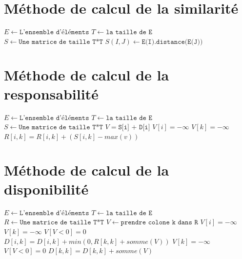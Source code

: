 \begin{appendix}
\section{Méthode de calcul de la similarité}
\label{sec:simcalc}
\begin{algorithmic}[1]
    \State $E \gets \texttt{L'ensemble d'éléments}$
    \State $T \gets \texttt{la taille de E}$
    \State $S \gets \texttt{Une matrice de taille T*T}$
            \State $S(I,J) \gets \texttt{E(I).distance(E(J))}$
        \EndFor
    \EndFor
\end{algorithmic}

\section{Méthode de calcul de la responsabilité}
\label{sec:rescalc}
\begin{algorithmic}[1]
    \State $E \gets \texttt{L'ensemble d'éléments}$
    \State $T \gets \texttt{la taille de E}$
    \State $S \gets \texttt{Une matrice de taille T*T}$
            \State $V = \texttt{S[i] + D[i]}$
            \State $V[i] = -\infty$ 
            \State $V[k] = -\infty$
            \State $R[i,k] = R[i,k] + (S[i,k] - max(v))$
        \EndFor
    \EndFor
\end{algorithmic}

\newpage
\section{Méthode de calcul de la disponibilité}
\label{sec:avacalc}
\begin{algorithmic}[1]
    \State $E \gets \texttt{L'ensemble d'éléments}$
    \State $T \gets \texttt{la taille de E}$
    \State $R \gets \texttt{Une matrice de taille T*T}$
            \State $V \gets \texttt{prendre colone k dans R}$
                \State $V[i] = -\infty$ 
                \State $V[k] = -\infty$
                \State $V[V < 0] = 0$
                \State $D[i,k] = D[i,k] + min(0, R[k,k] + somme(V))$
            \Else
                \State $V[k] = -\infty$
                \State $V[V < 0] = 0$
                \State $D[k,k] = D[k,k] + somme(V)$
            \EndIf
        \EndFor
    \EndFor
\end{algorithmic}





\end{appendix}